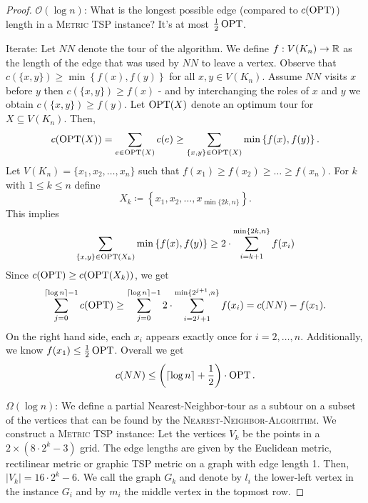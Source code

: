 \documentclass[../skript.tex]{subfiles}
\begin{document}
\begin{proof}
$\mathcal{O}(\log n)$: What is the longest possible edge (compared to $c(\operatorname{OPT})$) length in a \textsc{Metric TSP} instance? It's at most $\frac{1}{2} \operatorname{OPT}$.

Iterate: Let $NN$ denote the tour of the algorithm. We define $f : V(K_n) \to \mathbb{R}$ as the length of the edge that was used by $NN$ to leave a vertex. Observe that $c(\{ x, y \}) \geq \min \left\{ f(x), f(y) \right\}$ for all $x, y \in V(K_n)$.
Assume $NN$ visits $x$ before $y$ then $c(\{ x, y\}) \geq f(x)$ - and by interchanging the roles of $x$ and $y$ we obtain $c(\{x, y\}) \geq f(y)$.
Let $\operatorname{OPT}(X)$ denote an optimum tour for $X \subseteq V(K_n)$. Then,
\[
	c(\operatorname{OPT}(X)) = \sum_{e \in \operatorname{OPT}(X)} c(e) \geq \sum_{\{x, y\} \in \operatorname{OPT}(X)} \min\left\{ f(x), f(y) \right\}.
\]
Let $V(K_n) = \{ x_1, x_2, \ldots, x_n \}$ such that $f(x_1) \geq f(x_2) \geq \ldots \geq f(x_n)$.
For $k$ with $1 \leq k \leq n$ define
\[
	X_k \coloneqq \left\{ x_1, x_2, \ldots, x_{\min\{2k, n\}} \right\}.
\]
This implies
\[
	\sum_{\{x, y\} \in \operatorname{OPT}(X_k)} \min\left\{ f(x), f(y) \right\} \geq 2 \cdot \sum_{i=k+1}^{\min\{2k, n\}} f(x_i)
\]
Since $c(\operatorname{OPT}) \geq c(\operatorname{OPT}(X_k))$, we get
\[
	\sum_{j=0}^{\lceil \log n \rceil - 1} c(\operatorname{OPT}) \geq \sum_{j=0}^{\lceil \log n \rceil - 1} 2 \cdot \sum_{i=2^j + 1}^{\min\{2^{j+1}, n\}} f(x_i) = c(NN) - f(x_1).
\]
On the right hand side, each $x_i$ appears exactly once for $i = 2, \ldots, n$. Additionally, we know $f(x_1) \leq \frac{1}{2} \operatorname{OPT}$.
Overall we get
\[
	c(NN) \leq \left( \lceil \log n \rceil + \frac{1}{2} \right) \cdot \operatorname{OPT}.
\]

$\Omega(\log n)$: We define a partial Nearest-Neighbor-tour as a subtour on a subset of the vertices that can be found by the \textsc{Nearest-Neighbor-Algorithm}. We construct a \textsc{Metric TSP} instance: Let the vertices $V_k$ be the points in a $2 \times (8 \cdot 2^k - 3)$ grid. The edge lengths are given by the Euclidean metric, rectilinear metric or graphic TSP metric on a graph with edge length 1.
Then, $|V_k| = 16 \cdot 2^k - 6$. We call the graph $G_k$ and denote by $l_i$ the lower-left vertex in the instance $G_i$ and by $m_i$ the middle vertex in the topmost row.


\end{proof}
\end{document}
